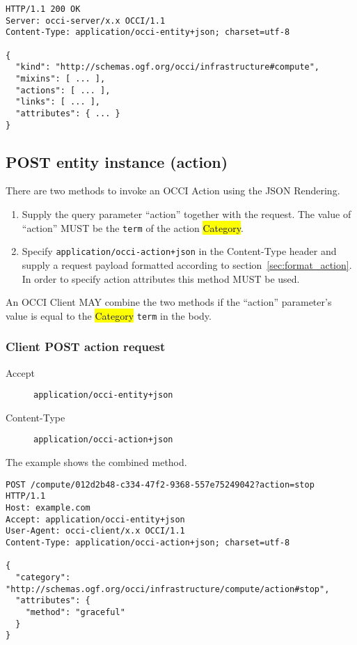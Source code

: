 \documentclass[10pt,a4paper]{article}
\begin{document}
\begin{verbatim}
HTTP/1.1 200 OK
Server: occi-server/x.x OCCI/1.1
Content-Type: application/occi-entity+json; charset=utf-8

{
  "kind": "http://schemas.ogf.org/occi/infrastructure#compute",
  "mixins": [ ... ],
  "actions": [ ... ],
  "links": [ ... ],
  "attributes": { ... }
}
\end{verbatim}


\subsection{POST entity instance (action)}
There are two methods to invoke an OCCI Action using the JSON Rendering.
\begin{enumerate}
\item Supply the query parameter ``action'' together with the request. The value
of ``action'' MUST be the {\tt term} of the action \hl{Category}.
\item Specify {\tt application/occi-action+json} in the Content-Type header
and supply a request payload formatted according to section~\ref{sec:format_action}.
In order to specify action attributes this method MUST be used.
\end{enumerate}
An OCCI Client MAY combine the two methods if the ``action'' parameter's value
is equal to the \hl{Category} {\tt term} in the body.

\subsubsection{Client POST action request}
\begin{description}
\item[Accept] {\tt application/occi-entity+json}
\item[Content-Type] {\tt application/occi-action+json}
\end{description}
The example shows the combined method.
\begin{verbatim}
POST /compute/012d2b48-c334-47f2-9368-557e75249042?action=stop HTTP/1.1
Host: example.com
Accept: application/occi-entity+json
User-Agent: occi-client/x.x OCCI/1.1
Content-Type: application/occi-action+json; charset=utf-8

{
  "category": "http://schemas.ogf.org/occi/infrastructure/compute/action#stop",
  "attributes": {
    "method": "graceful"
  }
}
\end{verbatim}
\end{document}
